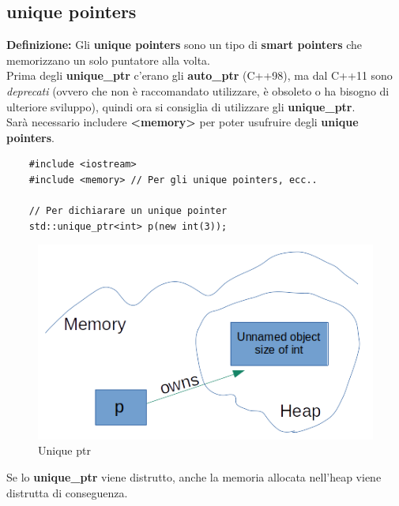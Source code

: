 
\subsection{unique pointers}

\textsf{\small \textbf{Definizione: } Gli \textbf{unique pointers} sono un tipo di \textbf{smart pointers} che memorizzano un solo puntatore alla volta.} \\

\textsf{\small Prima degli \textbf{unique\_ptr} c'erano gli \textbf{auto\_ptr} (C++98), ma dal C++11 sono \emph{deprecati} (ovvero che non è raccomandato utilizzare, è obsoleto o ha bisogno di ulteriore sviluppo), quindi ora si consiglia di utilizzare gli \textbf{unique\_ptr}. } \\

\textsf{\small Sarà necessario includere \textbf{<memory>} per poter usufruire degli \textbf{unique pointers}.} \\

\begin{lstlisting}
	#include <iostream>
	#include <memory> // Per gli unique pointers, ecc..
	
	// Per dichiarare un unique pointer
	std::unique_ptr<int> p(new int(3));
\end{lstlisting}

\begin{figure}[H]
	\centering
	\includegraphics[width=1\textwidth, height=1\textheight, keepaspectratio]{./imgs/unique_ptr_definition.png}
	\caption{Unique ptr}
	\label{fig:unique_ptr_definition}
\end{figure}

\textsf{\small Se lo \textbf{unique\_ptr} viene distrutto, anche la memoria allocata nell'heap viene distrutta di conseguenza.} \\

